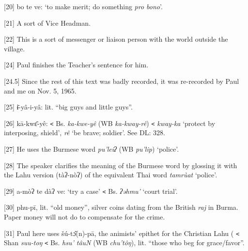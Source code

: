 {[20] bo te ve: `to make merit; do something }{\textit{pro bono}}{'.}

{[21] A sort of Vice Headman.}

{[22] This is a sort of messenger or liaison person with the world outside
the village.}

{[24] Paul finishes the Teacher's sentence for him.}

{[24.5] Since the rest of this text was badly recorded, it was re-recorded
by Paul and me on Nov. 5, 1965.}

{[25] ɨ̄-yâ-i-yâ: lit. ``big guys and little guys''.}

{[26] kā-kwɛ̄-yê: \texttt{<} Bs. }{\textit{ka-kwe-yê }}{(WB
}{\textit{ka-kway-rê}}{) \texttt{<} }{\textit{kway-ka}}{
`protect by interposing, shield', }{\textit{rê }}{`be brave; soldier'.
See DL: 328.}

{[27] He uses the Burmese word }{\textit{pu'leiʔ }}{(WB }{\textit{pu'lip}}{)
`police'.}

{[28] The speaker clarifies the meaning of the Burmese word by glossing
it with the Lahu version (tàʔ-nòʔ) of the equivalent Thai word }{\textit{tamrùat
}}{`police'.}

{[29] a-mòʔ te dàʔ ve: `try a case' \texttt{<} Bs. }{\textit{ʔəhmu'
}}{`court trial'.}

{[30] phu-pī, lit. ``old money'', silver coins dating from the British
}{\textit{raj}}{ in Burma. Paper money will not do to compensate
for the crime.}

{[31] Paul here uses šú-tɔ̂(n)-pā, the animists' epithet for the Christian
Lahu ( \texttt{<} Shan }{\textit{suu-toŋ}}{ \texttt{<} Bs. }{\textit{hsu'
tâuN}}{ (WB }{\textit{chu'tôŋ}}{), lit. ``those who beg
for grace/favor''.}


